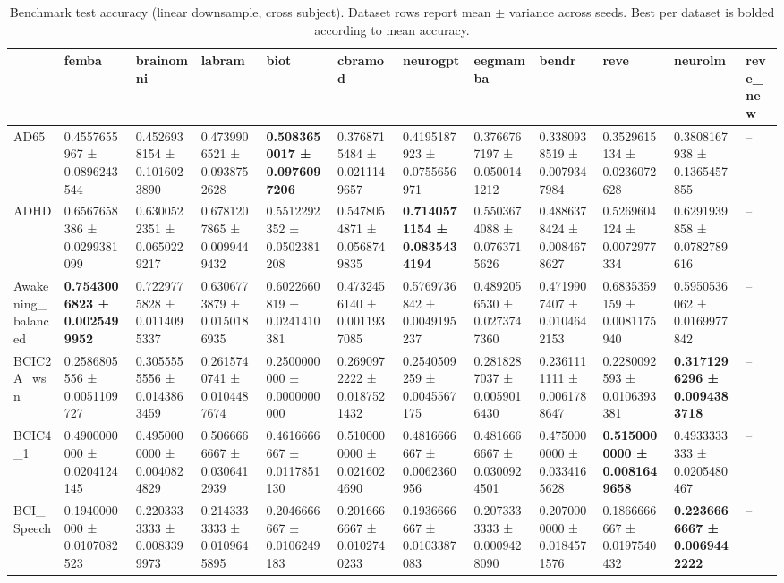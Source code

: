\begin{table}[htbp]
\caption{Benchmark test accuracy (linear downsample, cross subject). Dataset rows report mean $\pm$ variance across seeds. Best per dataset is bolded according to mean accuracy.}
\label{tab:benchmark_results_linear_downsample_cross_subject}
\begin{tabular}{llllllllllll}
\toprule
 & femba & brainomni & labram & biot & cbramod & neurogpt & eegmamba & bendr & reve & neurolm & reve_new \\
\midrule
AD65 & 0.4557655967 ± 0.0896243544 & 0.4526938154 ± 0.1016023890 & 0.4739906521 ± 0.0938752628 & \bfseries 0.5083650017 ± 0.0976097206 & 0.3768715484 ± 0.0211149657 & 0.4195187923 ± 0.0755656971 & 0.3766767197 ± 0.0500141212 & 0.3380938519 ± 0.0079347984 & 0.3529615134 ± 0.0236072628 & 0.3808167938 ± 0.1365457855 & -- \\
ADHD & 0.6567658386 ± 0.0299381099 & 0.6300522351 ± 0.0650229217 & 0.6781207865 ± 0.0099449432 & 0.5512292352 ± 0.0502381208 & 0.5478054871 ± 0.0568749835 & \bfseries 0.7140571154 ± 0.0835434194 & 0.5503674088 ± 0.0763715626 & 0.4886378424 ± 0.0084678627 & 0.5269604124 ± 0.0072977334 & 0.6291939858 ± 0.0782789616 & -- \\
Awakening_balanced & \bfseries 0.7543006823 ± 0.0025499952 & 0.7229775828 ± 0.0114095337 & 0.6306773879 ± 0.0150186935 & 0.6022660819 ± 0.0241410381 & 0.4732456140 ± 0.0011937085 & 0.5769736842 ± 0.0049195237 & 0.4892056530 ± 0.0273747360 & 0.4719907407 ± 0.0104642153 & 0.6835359159 ± 0.0081175940 & 0.5950536062 ± 0.0169977842 & -- \\
BCIC2A_wsn & 0.2586805556 ± 0.0051109727 & 0.3055555556 ± 0.0143863459 & 0.2615740741 ± 0.0104487674 & 0.2500000000 ± 0.0000000000 & 0.2690972222 ± 0.0187521432 & 0.2540509259 ± 0.0045567175 & 0.2818287037 ± 0.0059016430 & 0.2361111111 ± 0.0061788647 & 0.2280092593 ± 0.0106393381 & \bfseries 0.3171296296 ± 0.0094383718 & -- \\
BCIC4_1 & 0.4900000000 ± 0.0204124145 & 0.4950000000 ± 0.0040824829 & 0.5066666667 ± 0.0306412939 & 0.4616666667 ± 0.0117851130 & 0.5100000000 ± 0.0216024690 & 0.4816666667 ± 0.0062360956 & 0.4816666667 ± 0.0300924501 & 0.4750000000 ± 0.0334165628 & \bfseries 0.5150000000 ± 0.0081649658 & 0.4933333333 ± 0.0205480467 & -- \\
BCI_Speech & 0.1940000000 ± 0.0107082523 & 0.2203333333 ± 0.0083399973 & 0.2143333333 ± 0.0109645895 & 0.2046666667 ± 0.0106249183 & 0.2016666667 ± 0.0102740233 & 0.1936666667 ± 0.0103387083 & 0.2073333333 ± 0.0009428090 & 0.2070000000 ± 0.0184571576 & 0.1866666667 ± 0.0197540432 & \bfseries 0.2236666667 ± 0.0069442222 & -- \\

\end{tabular}
\end{table}
